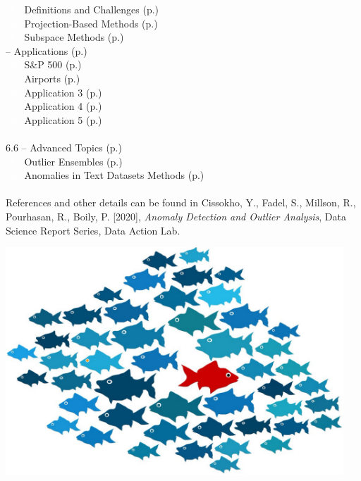 \documentclass[20pt,landscape,footrule,headrule]{foils}
\newcommand{\localtextbulletone}{{\raisebox{.45ex}{\rule{.6ex}{.6ex}}}}
\begin{document}
\small
\textcolor{white}{ab} \localtextbulletone\ Definitions and Challenges (p.\@\pageref{6.4.1}) \\ 
\textcolor{white}{ab} \localtextbulletone\ Projection-Based Methods (p.\@\pageref{6.4.2}) \\ 
\textcolor{white}{ab} \localtextbulletone\ Subspace  Methods (p.\@\pageref{6.4.3}) 
\normalsize
\newpage\ \\  -- Applications  (p.\pageref{6.5}) \\ 
\small
\textcolor{white}{ab} \localtextbulletone\ S\&P 500 (p.\@\pageref{6.5.1}) \\ 
\textcolor{white}{ab} \localtextbulletone\ Airports (p.\@\pageref{6.5.2}) \\ 
\textcolor{white}{ab} \localtextbulletone\ Application 3 (p.\@\pageref{6.5.3}) \\ 
\textcolor{white}{ab} \localtextbulletone\ Application 4 (p.\@\pageref{6.5.4}) \\ 
\textcolor{white}{ab} \localtextbulletone\ Application 5 (p.\@\pageref{6.5.5}) 
\normalsize \ \\ \ \\ 
6.6 -- Advanced Topics (p.\pageref{6.6}) \\ 
\small
\textcolor{white}{ab} \localtextbulletone\ Outlier Ensembles (p.\@\pageref{6.6.1}) \\ 
\textcolor{white}{ab} \localtextbulletone\ Anomalies in Text Datasets Methods (p.\@\pageref{6.6.2})\normalsize 
 \ \\ \ \\ 
References and other details can be found in Cissokho, Y., Fadel, S., Millson, R., Pourhasan, R., Boily, P. [2020], \textit{Anomaly Detection and Outlier Analysis}, Data Science Report Series, Data Action Lab.


\newpage
\begin{center}
\includegraphics[width=0.95\textwidth]{Images/fish.png}
\end{center}
\end{document}
